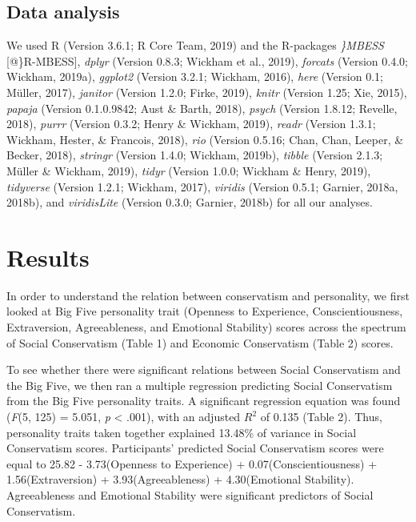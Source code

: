 \documentclass[man]{apa6}
\begin{document}
\hypertarget{data-analysis}{%
\subsection{Data analysis}\label{data-analysis}}

We used R (Version 3.6.1; R Core Team, 2019) and the R-packages \emph{\}MBESS} {[}@\}R-MBESS{]}, \emph{dplyr} (Version 0.8.3; Wickham et al., 2019), \emph{forcats} (Version 0.4.0; Wickham, 2019a), \emph{ggplot2} (Version 3.2.1; Wickham, 2016), \emph{here} (Version 0.1; Müller, 2017), \emph{janitor} (Version 1.2.0; Firke, 2019), \emph{knitr} (Version 1.25; Xie, 2015), \emph{papaja} (Version 0.1.0.9842; Aust \& Barth, 2018), \emph{psych} (Version 1.8.12; Revelle, 2018), \emph{purrr} (Version 0.3.2; Henry \& Wickham, 2019), \emph{readr} (Version 1.3.1; Wickham, Hester, \& Francois, 2018), \emph{rio} (Version 0.5.16; Chan, Chan, Leeper, \& Becker, 2018), \emph{stringr} (Version 1.4.0; Wickham, 2019b), \emph{tibble} (Version 2.1.3; Müller \& Wickham, 2019), \emph{tidyr} (Version 1.0.0; Wickham \& Henry, 2019), \emph{tidyverse} (Version 1.2.1; Wickham, 2017), \emph{viridis} (Version 0.5.1; Garnier, 2018a, 2018b), and \emph{viridisLite} (Version 0.3.0; Garnier, 2018b) for all our analyses.

\hypertarget{results}{%
\section{Results}\label{results}}

In order to understand the relation between conservatism and personality, we first looked at Big Five personality trait (Openness to Experience, Conscientiousness, Extraversion, Agreeableness, and Emotional Stability) scores across the spectrum of Social Conservatism (Table 1) and Economic Conservatism (Table 2) scores.

To see whether there were significant relations between Social Conservatism and the Big Five, we then ran a multiple regression predicting Social Conservatism from the Big Five personality traits. A significant regression equation was found (\emph{F}(5, 125) = 5.051, \emph{p} \textless{} .001), with an adjusted \(R^2\) of 0.135 (Table 2). Thus, personality traits taken together explained 13.48\% of variance in Social Conservatism scores. Participants' predicted Social Conservatism scores were equal to 25.82 - 3.73(Openness to Experience) + 0.07(Conscientiousness) + 1.56(Extraversion) + 3.93(Agreeableness) + 4.30(Emotional Stability). Agreeableness and Emotional Stability were significant predictors of Social Conservatism.
\end{document}
